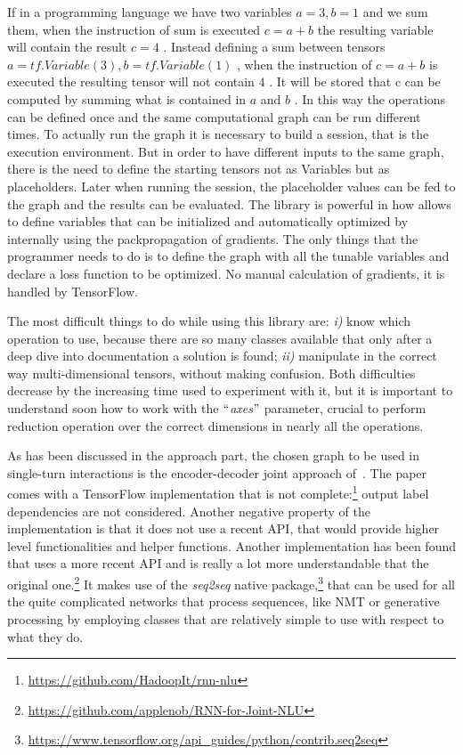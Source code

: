 If in a programming language we have two variables  \( a=3,b=1 \)  and we sum them, when the instruction of sum is executed  \( c=a+b \)  the resulting variable will contain the result  \( c=4 \) . Instead defining a sum between tensors  \( a=tf.Variable \left( 3 \right) ,b=tf.Variable \left( 1 \right)  \) , when the instruction of  \( c=a+b \)  is executed the resulting tensor will not contain  \( 4 \) . It will be stored that c can be computed by summing what is contained in  \( a \)  and  \( b \) . In this way the operations can be defined once and the same computational graph can be run different times. To actually run the graph it is necessary to build a session, that is the execution environment. But in order to have different inputs to the same graph, there is the need to define the starting tensors not as Variables but as placeholders. Later when running the session, the placeholder values can be fed to the graph and the results can be evaluated. The library is powerful in how allows to define variables that can be initialized and automatically optimized by internally using the packpropagation of gradients. The only things that the programmer needs to do is to define the graph with all the tunable variables and declare a loss function to be optimized. No manual calculation of gradients, it is handled by TensorFlow.

The most difficult things to do while using this library are: \textit{i)} know which operation to use, because there are so many classes available that only after a deep dive into documentation a solution is found; \textit{ii)} manipulate in the correct way multi-dimensional tensors, without making confusion. Both difficulties decrease by the increasing time used to experiment with it, but it is important to understand soon how to work with the $``$\textit{axes}$"$  parameter, crucial to perform reduction operation over the correct dimensions in nearly all the operations.

As has been discussed in the approach part, the chosen graph to be used in single-turn interactions is the encoder-decoder joint approach of~\cite{liu2016attention}. The paper comes with a TensorFlow implementation that is not complete:\footnote{\url{https://github.com/HadoopIt/rnn-nlu}} output label dependencies are not considered. Another negative property of the implementation is that it does not use a recent API, that would provide higher level functionalities and helper functions. Another implementation has been found that uses a more recent API and is really a lot more understandable that the original one.\footnote{\url{https://github.com/applenob/RNN-for-Joint-NLU}} It makes use of the \textit{seq2seq} native package,\footnote{\url{https://www.tensorflow.org/api\_guides/python/contrib.seq2seq}} that can be used for all the quite complicated networks that process sequences, like NMT or generative processing by employing classes that are relatively simple to use with respect to what they do.

